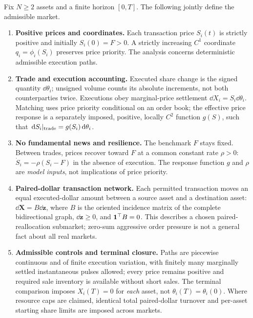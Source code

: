 \documentclass[review,hidelinks,onefignum,onetabnum]{siamonline250211}
\begin{document}
\begin{assumption}\label{asmp:model}
Fix $N\ge2$ assets and a finite horizon $[0,T]$. The following jointly define the admissible market.
\begin{enumerate}[label=\textup{(M\arabic*)},leftmargin=2.9em,itemsep=0.20em]
\item \textbf{Positive prices and coordinates.} Each transaction price $S_i(t)$ is strictly positive and initially $S_i(0)=F>0$. A strictly increasing $C^1$ coordinate $q_i=\phi_i(S_i)$ preserves price priority. The analysis concerns deterministic admissible execution paths.
\item \textbf{Trade and execution accounting.} Executed share change is the signed quantity $\dd\theta_i$; unsigned volume counts its absolute increments, not both counterparties twice. Executions obey marginal-price settlement $\dd X_i=S_i\dd\theta_i$. Matching uses price priority conditional on an order book; the effective price response is a separately imposed, positive, locally $C^2$ function $g(S)$, such that $\,\mathrm{d} S_i|_{\rm trade}=g(S_i)\,\mathrm{d}\theta_i$.
\item \textbf{No fundamental news and resilience.} The benchmark $F$ stays fixed. Between trades, prices recover toward $F$ at a common constant rate $\rho>0$: $\dot S_i=-\rho(S_i-F)$ in the absence of execution. The response function $g$ and $\rho$ are \emph{model inputs}, not implications of price priority.
\item \textbf{Paired-dollar transaction network.} Each permitted transaction moves an equal executed-dollar amount between a source asset and a destination asset: $\dd\bm X=B\dd\bm z$, where $B$ is the oriented incidence matrix of the complete bidirectional graph, $\dd\bm z\ge0$, and $\mathbf{1}^\top B=0$. This describes a chosen paired-reallocation submarket; zero-sum aggressive order pressure is not a general fact about all real markets.
\item \textbf{Admissible controls and terminal closure.} Paths are piecewise continuous and of finite execution variation, with finitely many marginally settled instantaneous pulses allowed; every price remains positive and required sale inventory is available without short sales. The terminal comparison imposes $X_i(T)=0$ for \emph{each} asset, not $\theta_i(T)=\theta_i(0)$. Where resource caps are claimed, identical total paired-dollar turnover and per-asset starting share limits are imposed across markets.
\end{enumerate}
\end{assumption}
\end{document}

